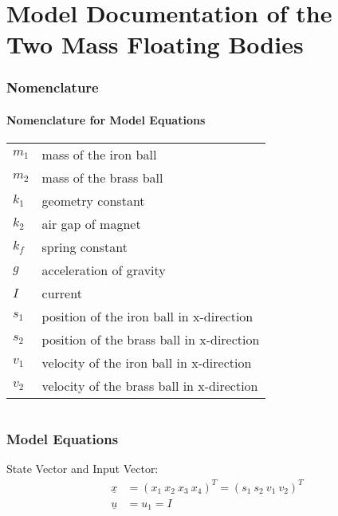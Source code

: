 \documentclass[10pt,a4paper]{article}
\begin{document}
	\part*{Model Documentation of the \\ Two Mass Floating Bodies} %
	
	
	\section{Nomenclature} %
	\subsection{Nomenclature for Model Equations} %
	
	\begin{tabular}{ll}
		$m_1$ & mass of the iron ball \\
		$m_2$ & mass of the brass ball \\
		$k_1$ & geometry constant \\
		$k_2$ & air gap of magnet \\
		$k_f$ & spring constant \\
		$g$ & acceleration of gravity \\
		$I$ & current \\
		$s_1$ & position of the iron ball in x-direction \\
		$s_2$ & position of the brass ball in x-direction \\		
		$v_1$ & velocity of the iron ball in x-direction \\
		$v_2$ & velocity of the brass ball in x-direction \\		
	\end{tabular}
	 
	
	\begin{tabular}{ll}

	\end{tabular}
	
	
	\section{Model Equations} %
	
	State Vector and Input Vector:
	\begin{align*}
		\underline{x} &= (x_1 \ x_2 \ x_3 \ x_4)^T = (s_1 \ s_2 \ v_1 \ v_2)^T \\
		\underline{u} &= u_1 = I
	\end{align*}
	
\end{document}
